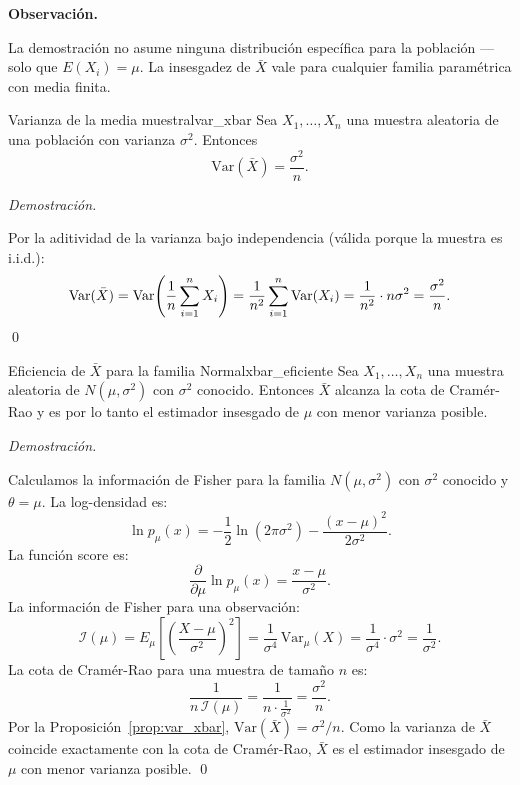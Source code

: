 \documentclass[12pt, a4paper]{book}
\newenvironment{observacion}{%
    \par\medskip\noindent\textbf{\color{azul}Observaci\'{o}n.}\enspace\itshape
}{\par\medskip}
\renewenvironment{proof}{%
    \par\medskip\noindent\textit{Demostraci\'{o}n.}\enspace
}{\qed\par\medskip}
\numberwithin{equation}{chapter}
\begin{document}
\begin{observacion}
	La demostraci\'{o}n no asume ninguna distribuci\'{o}n
	espec\'{i}fica para la poblaci\'{o}n --- solo que
	$E(X_i) = \mu$. La insesgadez de $\bar{X}$ vale para
	cualquier familia param\'{e}trica con media finita.
\end{observacion}

\begin{proposicion}{Varianza de la media muestral}{var_xbar}
	Sea $X_1, \ldots, X_n$ una muestra aleatoria de una
	poblaci\'{o}n con varianza $\sigma^2$. Entonces
	\[
	\mathrm{Var}(\bar{X}) = \frac{\sigma^2}{n}.
	\]
\end{proposicion}

\begin{proof}
	Por la aditividad de la varianza bajo independencia
	(v\'{a}lida porque la muestra es i.i.d.):
	\[
	\mathrm{Var}(\bar{X})
	= \mathrm{Var}\!\left(\frac{1}{n}
	\sum_{i=1}^n X_i\right)
	= \frac{1}{n^2}\sum_{i=1}^n \mathrm{Var}(X_i)
	= \frac{1}{n^2}\cdot n\sigma^2
	= \frac{\sigma^2}{n}. \qedhere
	\]
\end{proof}

\begin{proposicion}{Eficiencia de $\bar{X}$ para la
		familia Normal}{xbar_eficiente}
	Sea $X_1, \ldots, X_n$ una muestra aleatoria de
	$N(\mu, \sigma^2)$ con $\sigma^2$ conocido. Entonces
	$\bar{X}$ alcanza la cota de Cram\'{e}r-Rao y es por
	lo tanto el estimador insesgado de $\mu$ con menor
	varianza posible.
\end{proposicion}

\begin{proof}
	Calculamos la informaci\'{o}n de Fisher para la familia
	$N(\mu, \sigma^2)$ con $\sigma^2$ conocido y $\theta
	= \mu$. La log-densidad es:
	\[
	\ln p_\mu(x) = -\frac{1}{2}\ln(2\pi\sigma^2)
	- \frac{(x-\mu)^2}{2\sigma^2}.
	\]
	La funci\'{o}n score es:
	\[
	\frac{\partial}{\partial\mu}\ln p_\mu(x)
	= \frac{x - \mu}{\sigma^2}.
	\]
	La informaci\'{o}n de Fisher para una observaci\'{o}n:
	\[
	\mathcal{I}(\mu)
	= E_\mu\!\left[\left(\frac{X-\mu}{\sigma^2}
	\right)^2\right]
	= \frac{1}{\sigma^4}\,\mathrm{Var}_\mu(X)
	= \frac{1}{\sigma^4}\cdot\sigma^2
	= \frac{1}{\sigma^2}.
	\]
	La cota de Cram\'{e}r-Rao para una muestra de
	tama\~{n}o $n$ es:
	\[
	\frac{1}{n\,\mathcal{I}(\mu)}
	= \frac{1}{n \cdot \frac{1}{\sigma^2}}
	= \frac{\sigma^2}{n}.
	\]
	Por la Proposici\'{o}n~\ref{prop:var_xbar},
	$\mathrm{Var}(\bar{X}) = \sigma^2/n$. Como la
	varianza de $\bar{X}$ coincide exactamente con la
	cota de Cram\'{e}r-Rao, $\bar{X}$ es el estimador
	insesgado de $\mu$ con menor varianza posible.
	\qedhere
\end{proof}
\end{document}

